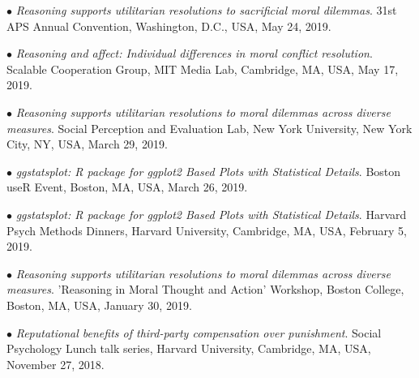 \documentclass[10pt]{article}
\begin{document}
	$\bullet$ \textit{Reasoning supports utilitarian resolutions to sacrificial moral dilemmas}. 31st APS Annual Convention, \hspace*{0.1in}Washington, D.C., USA, May 24, 2019.\\
	\miniskip

	$\bullet$ \textit{Reasoning and affect: Individual differences in moral conflict resolution}. Scalable Cooperation Group, MIT \hspace*{0.1in}Media Lab, Cambridge, MA, USA, May 17, 2019.\\
	\miniskip

	$\bullet$ \textit{Reasoning supports utilitarian resolutions to moral dilemmas across diverse measures}. Social Perception and \hspace*{0.1in}Evaluation Lab, New York University, New York City, NY, USA, March 29, 2019.\\
	\miniskip

	$\bullet$ \textit{ggstatsplot: R package for ggplot2 Based Plots with Statistical Details}. Boston useR Event, Boston, MA, \hspace*{0.1in}USA, March 26, 2019.\\
	\miniskip

	$\bullet$ \textit{ggstatsplot: R package for ggplot2 Based Plots with Statistical Details}. Harvard Psych Methods Dinners, \hspace*{0.1in}Harvard University, Cambridge, MA, USA, February 5, 2019.\\
	\miniskip

	$\bullet$ \textit{Reasoning supports utilitarian resolutions to moral dilemmas across diverse measures}. 'Reasoning in Moral \hspace*{0.1in}Thought and Action' Workshop, Boston College, Boston, MA, USA, January 30, 2019.\\
	\miniskip	
	
	$\bullet$ \textit{Reputational benefits of third-party compensation over punishment}. Social Psychology Lunch talk series, \hspace*{0.1in}Harvard University, Cambridge, MA, USA, November 27, 2018.\\
	\miniskip	

\end{document}
